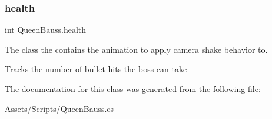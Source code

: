 \subsubsection{\texorpdfstring{health}{health}}
{\footnotesize\ttfamily int Queen\+Bauss.\+health}



The class the contains the animation to apply camera shake behavior to. 

Tracks the number of bullet hits the boss can take 

The documentation for this class was generated from the following file\+:\begin{DoxyCompactItemize}
\item 
Assets/\+Scripts/Queen\+Bauss.\+cs\end{DoxyCompactItemize}
